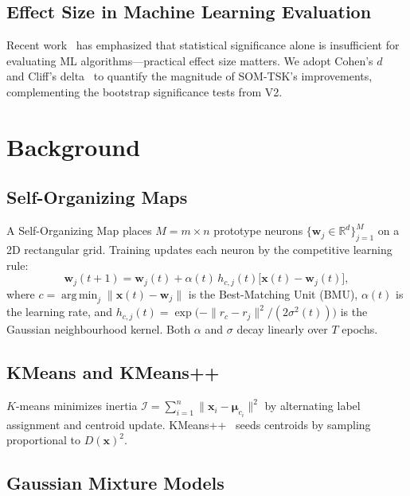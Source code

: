 \documentclass[journal]{IEEEtran}
\DeclareMathOperator*{\argmin}{arg\,min}
\begin{document}
\subsection{Effect Size in Machine Learning Evaluation}

Recent work~\cite{demsar2006statistical,benavoli2017time} has emphasized that statistical significance alone is insufficient for evaluating ML algorithms---practical effect size matters. We adopt Cohen's $d$~\cite{cohen1988statistical} and Cliff's delta~\cite{cliff1993dominance} to quantify the magnitude of SOM-TSK's improvements, complementing the bootstrap significance tests from V2.


\section{Background}
\label{sec:background}

\subsection{Self-Organizing Maps}

A Self-Organizing Map places $M = m \times n$ prototype neurons $\{\mathbf{w}_j \in \mathbb{R}^d\}_{j=1}^{M}$ on a 2D rectangular grid. Training updates each neuron by the competitive learning rule:
\begin{equation}
  \mathbf{w}_j(t+1) = \mathbf{w}_j(t) + \alpha(t)\,h_{c,j}(t)\bigl[\mathbf{x}(t) - \mathbf{w}_j(t)\bigr],
  \label{eq:som_update}
\end{equation}
where $c = \argmin_j \|\mathbf{x}(t) - \mathbf{w}_j\|$ is the Best-Matching Unit (BMU), $\alpha(t)$ is the learning rate, and $h_{c,j}(t) = \exp\!\bigl(-\|r_c - r_j\|^2/(2\sigma^2(t))\bigr)$ is the Gaussian neighbourhood kernel. Both $\alpha$ and $\sigma$ decay linearly over $T$ epochs.

\subsection{KMeans and KMeans++}

$K$-means minimizes inertia $\mathcal{I} = \sum_{i=1}^n \|\mathbf{x}_i - \boldsymbol{\mu}_{c_i}\|^2$ by alternating label assignment and centroid update. KMeans++~\cite{arthur2007kmeans} seeds centroids by sampling proportional to $D(\mathbf{x})^2$.

\subsection{Gaussian Mixture Models}
\end{document}
